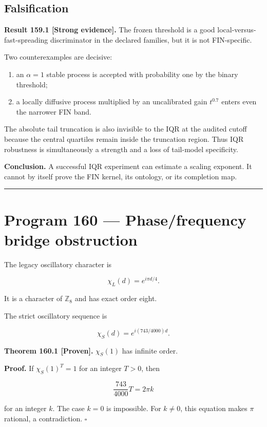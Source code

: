 \documentclass[11pt,a4paper,openany]{report}
\newcommand{\statusProven}{\textcolor{fingreen}{[Proven]}}
\newcommand{\statusStrong}{\textcolor{finblue}{[Strong evidence]}}
\begin{document}
\section{Falsification}

\textbf{Result 159.1 \statusStrong{}.} The frozen threshold is a good local-versus-fast-spreading discriminator in the declared families, but it is not FIN-specific.

Two counterexamples are decisive:

\begin{enumerate}
\item 
an \(\alpha=1\) stable process is accepted with probability one by the binary threshold;

\item 
a locally diffusive process multiplied by an uncalibrated gain \(t^{0.7}\) enters even the narrower FIN band.

\end{enumerate}

The absolute tail truncation is also invisible to the IQR at the audited cutoff because the central quartiles remain inside the truncation region. Thus IQR robustness is simultaneously a strength and a loss of tail-model specificity.

\textbf{Conclusion.} A successful IQR experiment can estimate a scaling exponent. It cannot by itself prove the FIN kernel, its ontology, or its completion map.

\par\medskip\hrule\medskip

\chapter{Program 160 --- Phase/\allowbreak{}frequency bridge obstruction}

The legacy oscillatory character is

\[
\chi_L(d)=e^{i\pi d/4}.
\]

It is a character of \(\mathbb Z_8\) and has exact order eight.

The strict oscillatory sequence is

\[
\chi_S(d)=e^{i(743/4000)d}.
\]

\textbf{Theorem 160.1 \statusProven{}.} \(\chi_S(1)\) has infinite order.

\textbf{Proof.} If \(\chi_S(1)^T=1\) for an integer \(T>0\), then

\[
\frac{743}{4000}T=2\pi k
\]

for an integer \(k\). The case \(k=0\) is impossible. For \(k\ne0\), this equation makes \(\pi\) rational, a contradiction. \(\square\)
\end{document}
